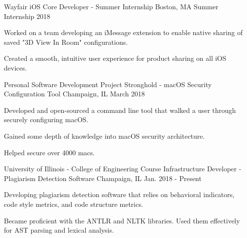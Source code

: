 
\begin{cventries}

  \cventry
{Wayfair} %
{iOS Core Developer - Summer Internship} %
{Boston, MA} %
{Summer Internship 2018} %
{
	\begin{cvitems} %
		\item {Worked on a team developing an iMessage extension to enable native sharing of saved "3D View In Room" configurations.}
		\item {Created a smooth, intuitive user experience for product sharing on all iOS devices.}
	\end{cvitems}
}

  \cventry
{Personal Software Development Project} %
{Stronghold - macOS Security Configuration Tool} %
{Champaign, IL} %
{March 2018} %
{
	\begin{cvitems} %
		\item {Developed and open-sourced a command line tool that walked a user through securely configuring macOS.}
		\item{Gained some depth of knowledge into macOS security architecture.} 
		\item {Helped secure over 4000 macs.}
	\end{cvitems}
}
  \cventry
    {University of Illinois - College of Engineering} %
    {Course Infrastructure Developer - Plagiarism Detection Software} %
    {Champaign, IL} %
    {Jan. 2018 - Present} %
    {
      \begin{cvitems} %
        \item {Developing plagiarism detection software that relies on behavioral indicators, code style metrics, and code structure metrics.}
        \item {Became proficient with the ANTLR and NLTK libraries. Used them effectively for AST parsing and lexical analysis.}
      \end{cvitems}
    }


\end{cventries}
